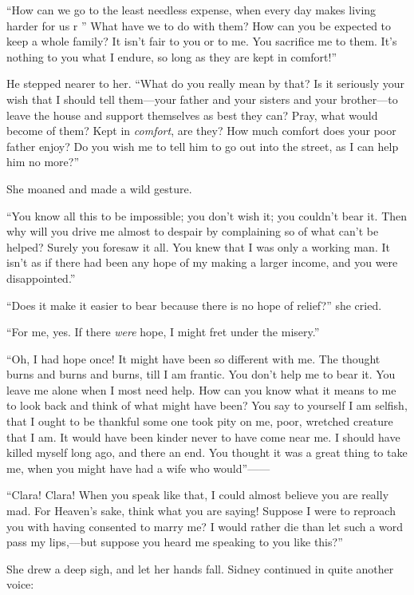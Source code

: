 ``How can we go to the least needless expense, when every day makes
living harder for us r '' What have we to do with them? How can you be
expected to keep a whole family? It isn't fair to you or to me. You
sacrifice me to them. It's nothing to you what I endure, so long as they
are kept in comfort!''

He stepped nearer to her. ``What do you really mean by that? Is it
seriously your wish that I should tell them---your father and your
sisters and your brother---to leave the house and support themselves as
best they can? Pray, what would become of them? Kept in \emph{comfort},
are they? How much comfort does your poor father enjoy? Do you wish me
to tell him to go out into the street, as I can help him no more?''

She moaned and made a wild gesture.

``You know all this to be impossible; you
{\protect\hypertarget{278}{}{}}don't wish it; you couldn't bear it. Then
why will you drive me almost to despair by complaining so of what can't
be helped? Surely you foresaw it all. You knew that I was only a working
man. It isn't as if there had been any hope of my making a larger
income, and you were disappointed.''

``Does it make it easier to bear because there is no hope of relief?''
she cried.

``For me, yes. If there \emph{were} hope, I might fret under the
misery.''

``Oh, I had hope once! It might have been so different with me. The
thought burns and burns and burns, till I am frantic. You don't help me
to bear it. You leave me alone when I most need help. How can you know
what it means to me to look back and think of what might have been? You
say to yourself I am selfish, that I ought to be thankful some one took
pity on me, poor, wretched creature that I am. It would have been kinder
never to have come near me. I should have killed myself long ago, and
there an end. You thought it was a great thing to take me, when you
might have had a wife who would''{{------}}

``Clara! Clara! When you speak like that,
{\protect\hypertarget{279}{}{}}I could almost believe you are really
mad. For Heaven's sake, think what you are saying! Suppose I were to
reproach you with having consented to marry me? I would rather die than
let such a word pass my lips,---but suppose you heard me speaking to you
like this?''

She drew a deep sigh, and let her hands fall. Sidney continued in quite
another voice:

